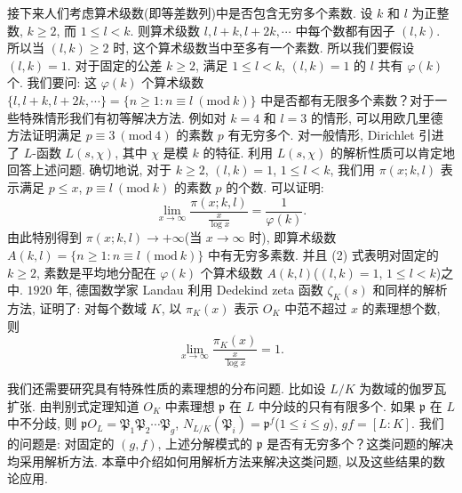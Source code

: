 接下来人们考虑算术级数(即等差数列)中是否包含无穷多个素数. 设 $k$ 和 $l$ 为正整数, $k\geqslant 2$, 而 $1\leqslant l<k$. 则算术级数 $l,l+k,l+2k,\cdots$ 中每个数都有因子 $(l,k)$. 所以当 $(l,k)\geqslant 2$ 时, 这个算术级数当中至多有一个素数. 所以我们要假设 $(l,k)=1$. 对于固定的公差 $k\geqslant 2$, 满足 $1\leqslant l<k$, $(l,k)=1$ 的 $l$ 共有 $\varphi(k)$ 个. 我们要问: 这 $\varphi(k)$ 个算术级数 $\{l,l+k,l+2k,\cdots\}=\{n\geqslant 1:n\equiv l\ (\mathrm{mod}\ k)\}$ 中是否都有无限多个素数？对于一些特殊情形我们有初等解决方法. 例如对 $k=4$ 和 $l=3$ 的情形, 可以用欧几里德方法证明满足 $p\equiv 3\ (\mathrm{mod}\ 4)$ 的素数 $p$ 有无穷多个. 对一般情形, Dirichlet 引进了 $L$-函数 $L(s,\chi)$, 其中 $\chi$ 是模 $k$ 的特征. 利用 $L(s,\chi)$ 的解析性质可以肯定地回答上述问题. 确切地说, 对于 $k\geqslant 2$, $(l,k)=1$, $1\leqslant l<k$, 我们用 $\pi(x;k,l)$ 表示满足 $p\leqslant x$, $p\equiv l\ (\mathrm{mod}\ k)$ 的素数 $p$ 的个数. 可以证明: 
\begin{equation}  \lim_{x\to\infty}\frac{\pi(x;k,l)}{\frac{x}{\log x}}=\frac{1}{\varphi(k)}.\tag{2}\end{equation}
由此特别得到 $\pi(x;k,l)\to+\infty$(当 $x\to\infty$ 时), 即算术级数 $A(k,l)=\{n\geqslant 1:n\equiv l\ (\mathrm{mod}\ k)\}$ 中有无穷多素数. 并且 (2) 式表明对固定的 $k\geqslant 2$, 素数是平均地分配在 $\varphi(k)$ 个算术级数 $A(k,l)$($(l,k)=1$, $1\leqslant l<k$)之中. $1920$ 年, 德国数学家 Landau 利用 Dedekind zeta 函数 $\zeta_K(s)$ 和同样的解析方法, 证明了: 对每个数域 $K$, 以 $\pi_K(x)$ 表示 $O_K$ 中范不超过 $x$ 的素理想个数, 则
\begin{equation}  \lim_{x\to\infty}\frac{\pi_K(x)}{\frac{x}{\log x}}=1.\tag{3}\end{equation}

\begin{sloppypar}
我们还需要研究具有特殊性质的素理想的分布问题. 比如设 $L/K$ 为数域的伽罗瓦扩张. 由判别式定理知道 $O_K$ 中素理想 $\mathfrak{p}$ 在 $L$ 中分歧的只有有限多个. 如果 $\mathfrak{p}$ 在 $L$ 中不分歧, 则 $\mathfrak{p}O_L=\mathfrak{P}_1\mathfrak{P}_2\cdots\mathfrak{P}_g$, $N_{L/K}(\mathfrak{P}_i)=\mathfrak{p}^f$($1\leqslant i\leqslant g$), $gf=[L:K]$. 我们的问题是: 对固定的 $(g,f)$, 上述分解模式的 $\mathfrak{p}$ 是否有无穷多个？这类问题的解决均采用解析方法. 本章中介绍如何用解析方法来解决这类问题, 以及这些结果的数论应用. 
\end{sloppypar}



